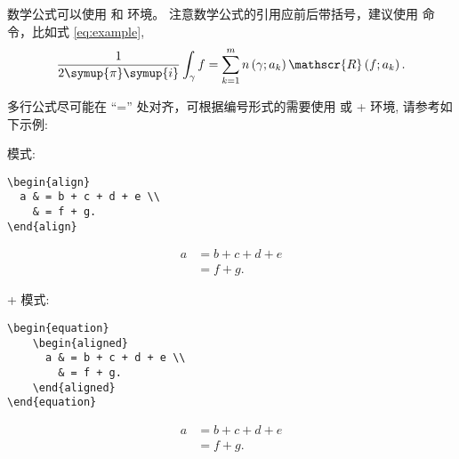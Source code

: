 数学公式可以使用  和  环境。
注意数学公式的引用应前后带括号，建议使用  命令，比如式 \eqref{eq:example},
\begin{equation}
  \frac{1}{2 \symup{\pi} \symup{i}} \int_\gamma f = \sum_{k=1}^m n\left(\gamma; a_k\right) \mathscr{R}\left(f; a_k\right).
  \label{eq:example}
\end{equation}

多行公式尽可能在 ``='' 处对齐，可根据编号形式的需要使用  或 + 环境, 请参考如下示例:

模式: 

\begin{minipage}{.48\textwidth}
    \begin{verbatim}
\begin{align}
  a & = b + c + d + e \\
    & = f + g.
\end{align}
    \end{verbatim}
\end{minipage}
\begin{minipage}{.48\textwidth}
  \begin{align}\label{eq:align}
    a & = b + c + d + e \\
      & = f + g.
  \end{align}
\end{minipage}

 +  模式:

\begin{minipage}{.48\textwidth}
    \begin{verbatim}
\begin{equation}
    \begin{aligned}
      a & = b + c + d + e \\
        & = f + g.
    \end{aligned}
\end{equation}
    \end{verbatim}
\end{minipage}
\begin{minipage}{.48\textwidth}
    \begin{equation}\label{eq:equ_aligned}
        \begin{aligned}
          a & = b + c + d + e\\
            & = f + g.
        \end{aligned}
    \end{equation}
\end{minipage}

